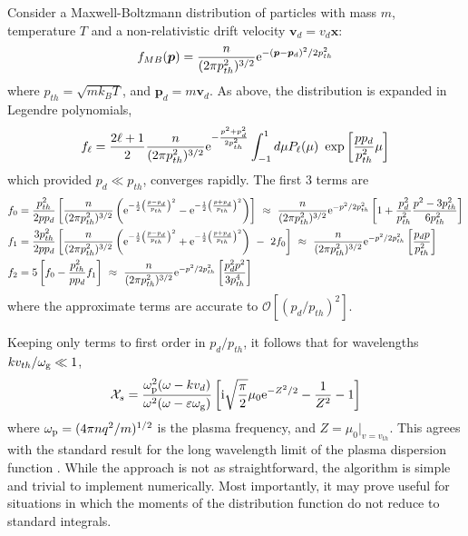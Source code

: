 \documentclass[a4paper,fleqn,usenatbib]{mnras}
\newcommand{\eqnb}{\begin{equation*}}
\newcommand{\eqne}{\end{equation*}}
\begin{document}
Consider a Maxwell-Boltzmann distribution of particles with mass $m$,  temperature $T$ and a non-relativistic drift velocity $\bm{v}_d = v_d \bm{\hat{x}}$:
\eqnb
f_{MB}(\bm{p}) = \frac{n}{(2 \pi p_{th}^2)^{3/2}} {\rm e}^{-(\bm{p}-\bm{p}_d)^2/2 p_{th}^2}
\eqne
where $p_{th} = \sqrt{m k_B T}$, and $\bm{p}_d=m \bm{v}_d$. As above, the distribution is expanded in Legendre polynomials, 
\eqnb
f_\ell = \frac{2 \ell +1}{2}  \frac{n}{(2 \pi p_{th}^2)^{3/2}} {\rm e}^{-\frac{{p}^2+p_d^2}{2 p_{th}^2}} \int_{-1}^{1}  d\mu P_\ell(\mu) ~ \exp\left[{\frac{p p_d}{p_{th}^2} \mu}\right]
\eqne
which provided $p_d \ll p_{th}$, converges rapidly. The first 3 terms are
\begin{align*}
&f_0 =   \frac{p_{th}^2}{2pp_d}\left[\frac{n}{(2 \pi p_{th}^2)^{3/2}}\left( {\rm e}^{-\frac{1}{2} \left( \frac{p-p_d}{p_{th}}\right)^2 }
-{\rm e}^{-\frac{1}{2} \left( \frac{p+p_d}{p_{th}}\right)^2}\right)\right] ~\approx~ 
\frac{n}{(2 \pi p_{th}^2)^{3/2}} {\rm e}^{-p^2/2 p_{th}^2}
\left[1+\frac{p_d^2}{ p_{th}^2}\frac{p^2-3 p_{th}^2}{6 p_{th}^2}\right]
\\
&f_1=   \frac{3 p_{th}^2}{2pp_d}\left[\frac{n}{(2 \pi p_{th}^2)^{3/2}}\left( {\rm e}^{-\frac{1}{2} \left( \frac{p-p_d}{p_{th}}\right)^2 }
+{\rm e}^{-\frac{1}{2} \left( \frac{p+p_d}{p_{th}}\right)^2}\right) ~ - ~2 f_0\right] ~\approx~ 
\frac{n}{(2 \pi p_{th}^2)^{3/2}} {\rm e}^{-p^2/2 p_{th}^2}
\left[\frac{p_d p}{ p_{th}^2}\right]\\
&f_2=5\left[ f_0 -  \frac{p_{th}^2}{pp_d} f_1\right]  ~\approx~ 
\frac{n}{(2 \pi p_{th}^2)^{3/2}} {\rm e}^{-p^2/2 p_{th}^2}
\left[\frac{p^2_d p^2}{3 p_{th}^4}\right]
\end{align*}
where the approximate terms are accurate to $\mathcal{O} \left[(p_d/p_{th})^2\right]$.

Keeping only terms to first order in $p_d/p_{th}$, it follows that for wavelengths $k v_{th}/\omega_{\rm g} \ll 1$, 
\eqnb
\mathcal{X}_s = \frac{\omega_{\rm p}^2 (\omega -k v_d)}{\omega^2 (\omega-\varepsilon \omega_{\rm g})}
\left[ {\rm i} \sqrt{\frac{\pi}{2}} \mu_0 {\rm e}^{-Z^2/2} - \frac{1}{Z^2} -1\right]
\eqne
where  $\omega_{\rm p} = (4 \pi n q^2/m)^{1/2}$ is the plasma frequency, and $Z=\mu_0|_{v=v_{th}}$. This agrees with the standard result for the long wavelength limit of the plasma dispersion function \cite[e.g.][]{Ichimaru}. While the approach is not as straightforward, the algorithm is simple and trivial to implement numerically. Most importantly, it may prove useful for situations in which the moments of the distribution function do not reduce to standard integrals.
\end{document}

